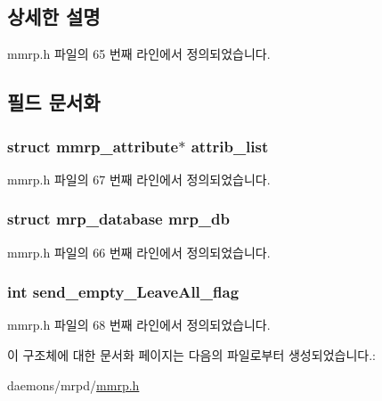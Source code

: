 \subsection{상세한 설명}


mmrp.\+h 파일의 65 번째 라인에서 정의되었습니다.



\subsection{필드 문서화}
\subsubsection[{\texorpdfstring{attrib\+\_\+list}{attrib_list}}]{\setlength{\rightskip}{0pt plus 5cm}struct {\bf mmrp\+\_\+attribute}$\ast$ attrib\+\_\+list}\hypertarget{structmmrp__database_aa65ffa246b17a8932ec564602195a338}{}\label{structmmrp__database_aa65ffa246b17a8932ec564602195a338}


mmrp.\+h 파일의 67 번째 라인에서 정의되었습니다.

\subsubsection[{\texorpdfstring{mrp\+\_\+db}{mrp_db}}]{\setlength{\rightskip}{0pt plus 5cm}struct {\bf mrp\+\_\+database} mrp\+\_\+db}\hypertarget{structmmrp__database_a7e08db3b85c932325ce3a3605a09ab0c}{}\label{structmmrp__database_a7e08db3b85c932325ce3a3605a09ab0c}


mmrp.\+h 파일의 66 번째 라인에서 정의되었습니다.

\subsubsection[{\texorpdfstring{send\+\_\+empty\+\_\+\+Leave\+All\+\_\+flag}{send_empty_LeaveAll_flag}}]{\setlength{\rightskip}{0pt plus 5cm}int send\+\_\+empty\+\_\+\+Leave\+All\+\_\+flag}\hypertarget{structmmrp__database_a5c551b6ff3976e96ec18e69b0706a532}{}\label{structmmrp__database_a5c551b6ff3976e96ec18e69b0706a532}


mmrp.\+h 파일의 68 번째 라인에서 정의되었습니다.



이 구조체에 대한 문서화 페이지는 다음의 파일로부터 생성되었습니다.\+:\begin{DoxyCompactItemize}
\item 
daemons/mrpd/\hyperlink{mmrp_8h}{mmrp.\+h}\end{DoxyCompactItemize}
